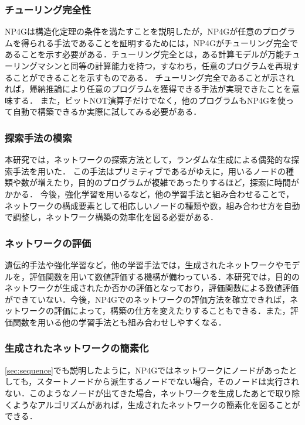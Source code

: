 \documentclass[exploratorypaper]{jsaiart} %
\begin{document}
\subsubsection{チューリング完全性}
NP4Gは構造化定理の条件を満たすことを説明したが，NP4Gが任意のプログラムを得られる手法であることを証明するためには，NP4Gがチューリング完全であることを示す必要がある．チューリング完全とは，ある計算モデルが万能チューリングマシンと同等の計算能力を持つ，すなわち，任意のプログラムを再現することができることを示すものである．
チューリング完全であることが示されれば，帰納推論により任意のプログラムを獲得できる手法が実現できたことを意味する．
また，ビットNOT演算子だけでなく，他のプログラムもNP4Gを使って自動で構築できるか実際に試してみる必要がある．
\subsubsection{探索手法の模索}
本研究では，ネットワークの探索方法として，ランダムな生成による偶発的な探索手法を用いた．
この手法はプリミティブであるがゆえに，用いるノードの種類や数が増えたり，目的のプログラムが複雑であったりするほど，探索に時間がかかる．
今後，強化学習を用いるなど，他の学習手法と組み合わせることで，ネットワークの構成要素として相応しいノードの種類や数，組み合わせ方を自動で調整し，ネットワーク構築の効率化を図る必要がある．
\subsubsection{ネットワークの評価}
遺伝的手法や強化学習など，他の学習手法では，生成されたネットワークやモデルを，評価関数を用いて数値評価する機構が備わっている．本研究では，目的のネットワークが生成されたか否かの評価となっており，評価関数による数値評価ができていない．今後，NP4Gでのネットワークの評価方法を確立できれば，ネットワークの評価によって，構築の仕方を変えたりすることもできる．また，評価関数を用いる他の学習手法とも組み合わせしやすくなる．
\subsubsection{生成されたネットワークの簡素化}
\ref{sec:sequence}でも説明したように，NP4Gではネットワークにノードがあったとしても，スタートノードから派生するノードでない場合，そのノードは実行されない．このようなノードが出てきた場合，ネットワークを生成したあとで取り除くようなアルゴリズムがあれば，生成されたネットワークの簡素化を図ることができる．
\end{document}
